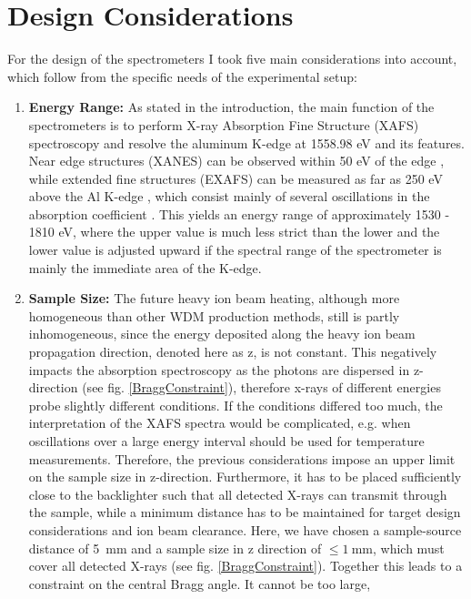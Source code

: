 \section{Design Considerations}
\label{section: design considerations}
For the design of the spectrometers I took five main 
considerations into 
account, which follow from the specific needs of the experimental setup:
\begin{enumerate}
	\item \textbf{Energy Range:} As stated in 
	the introduction, the main function of the 
	spectrometers is to perform X-ray Absorption 
	Fine Structure (XAFS) spectroscopy and 
	resolve the aluminum K-edge at 1558.98 
	\unit{eV} \citep{henke1993x} and its 
	features. Near edge structures 
	(XANES) can be observed within 
	50 \unit{eV} of the edge 
	\citep{peyrusse2009k}, while extended 
	fine 
	structures (EXAFS) can be measured as far 
	as 250 eV above the Al K-edge 
	\citep{fontaine1979soft}, which consist mainly of 
	several oscillations in the absorption 
	coefficient 
	\citep{levy2010double}. This yields an energy 
	range of approximately 1530 - 
	1810 \unit{eV}, where the upper value is much
	less strict than the lower and the lower value is 
	adjusted upward if the spectral range of the 
	spectrometer is mainly the immediate area of the 
	K-edge.
	\item \textbf{Sample Size:} The future heavy ion beam heating, 
	although more homogeneous than other WDM production methods, still 
	is partly inhomogeneous, since the energy deposited along the 
	heavy ion beam propagation direction, denoted 
	here as z, is not constant. This negatively impacts the absorption spectroscopy as the photons are dispersed in z-direction (see fig. \ref{BraggConstraint}), therefore x-rays of different energies probe slightly different conditions. If the conditions differed too much, the  interpretation of the XAFS spectra would be complicated, e.g. when oscillations over a large energy interval should be used for temperature measurements. Therefore, the previous considerations impose an upper limit on the sample size in z-direction. Furthermore, it has to be placed sufficiently close to the backlighter such that all detected X-rays can transmit through the sample, while a minimum distance has to be maintained for target design considerations and ion beam clearance. Here, we have chosen a sample-source distance of \SI{5}{\milli\meter} and a sample size in z direction of $\leq\SI{1}{\milli\meter}$, which must cover all detected X-rays (see fig. \ref{BraggConstraint}). Together this leads to a constraint on the central Bragg angle. It cannot be too large, 

\end{enumerate}
